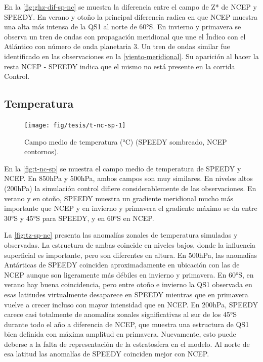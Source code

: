 \documentclass[spanish,a4paper,12pt,oneside]{book}
\begin{document}
En la \autoref{fig:ghz-dif-sp-nc} se muestra la diferencia entre el
campo de Z* de NCEP y SPEEDY. En verano y otoño la principal diferencia
radica en que NCEP muestra una alta más intensa de la QS1 al norte de
60°S. En invierno y primavera se observa un tren de ondas con
propagación meridional que une el Índico con el Atlántico con número de
onda planetaria 3. Un tren de ondas similar fue identificado en las
observaciones en la \autoref{viento-meridional}. Su aparición al hacer
la resta NCEP - SPEEDY indica que el mismo no está presente en la
corrida Control.

\subsection{Temperatura}\label{temperatura-1}

\begin{landscape}\begin{figure}

{\centering \texttt{[image: fig/tesis/t-nc-sp-1]} 

}

\caption{Campo medio de temperatura (°C) (SPEEDY sombreado, NCEP contornos).}\label{fig:t-nc-sp}
\end{figure}
\end{landscape}

En la \autoref{fig:t-nc-sp} se muestra el campo medio de temperatura de
SPEEDY y NCEP. En 850hPa y 500hPa, ambos campos son muy similares. En
niveles altos (200hPa) la simulación control difiere considerablemente
de las observaciones. En verano y en otoño, SPEEDY muestra un gradiente
meridional mucho más importante que NCEP y en invierno y primavera el
gradiente máximo se da entre 30°S y 45°S para SPEEDY, y en 60°S en NCEP.

La \autoref{fig:tz-sp-nc} presenta las anomalías zonales de temperatura
simuladas y observadas. La estructura de ambas coincide en niveles
bajos, donde la influencia superficial es importante, pero son
diferentes en altura. En 500hPa, las anomalías Antárticas de SPEEDY
coinciden aproximadamente en ubicación con las de NCEP aunque son
ligeramente más débiles en invierno y primavera. En 60°S, en verano hay
buena coincidencia, pero entre otoño e invierno la QS1 observada en esas
latitudes virtualmente desaparece en SPEEDY mientras que en primavera
vuelve a crecer incluso con mayor intensidad que en NCEP. En 200hPa,
SPEEDY carece casi totalmente de anomalías zonales significativas al sur
de los 45°S durante todo el año a diferencia de NCEP, que muestra una
estructura de QS1 bien definida con máxima amplitud en primavera.
Nuevamente, esto puede deberse a la falta de representación de la
estratosfera en el modelo. Al norte de esa latitud las anomalías de
SPEEDY coinciden mejor con NCEP.
\end{document}
